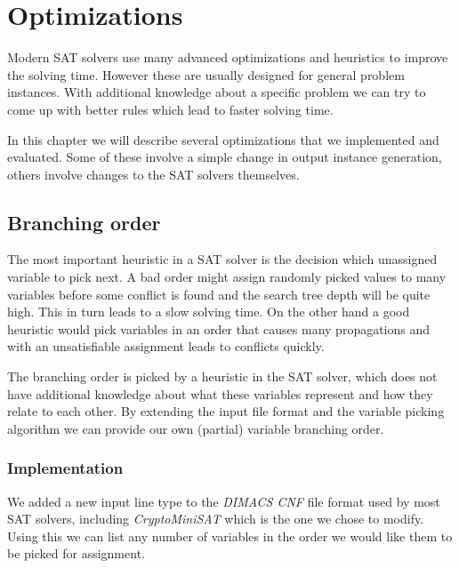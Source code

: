 \section{Optimizations}

Modern SAT solvers use many advanced optimizations and heuristics to improve the solving time.
However these are usually designed for general problem instances.
With additional knowledge about a specific problem we can try to come up with better rules which lead to faster solving time.

In this chapter we will describe several optimizations that we implemented and evaluated.
Some of these involve a simple change in output instance generation, others involve changes to the SAT solvers themselves.


\subsection{Branching order}


The most important heuristic in a SAT solver is the decision which unassigned variable to pick next.
A bad order might assign randomly picked values to many variables before some conflict is found and the search tree depth will be quite high.
This in turn leads to a slow solving time.
On the other hand a good heuristic would pick variables in an order that causes many propagations and with an unsatisfiable assignment leads to conflicts quickly.

The branching order is picked by a heuristic in the SAT solver, which does not have additional knowledge about what these variables represent and how they relate to each other.
By extending the input file format and the variable picking algorithm we can provide our own (partial) variable branching order.

\subsubsection{Implementation}

We added a new input line type to the \emph{DIMACS CNF} file format used by most SAT solvers, including \emph{CryptoMiniSAT} which is the one we chose to modify.
Using this we can list any number of variables in the order we would like them to be picked for assignment.

